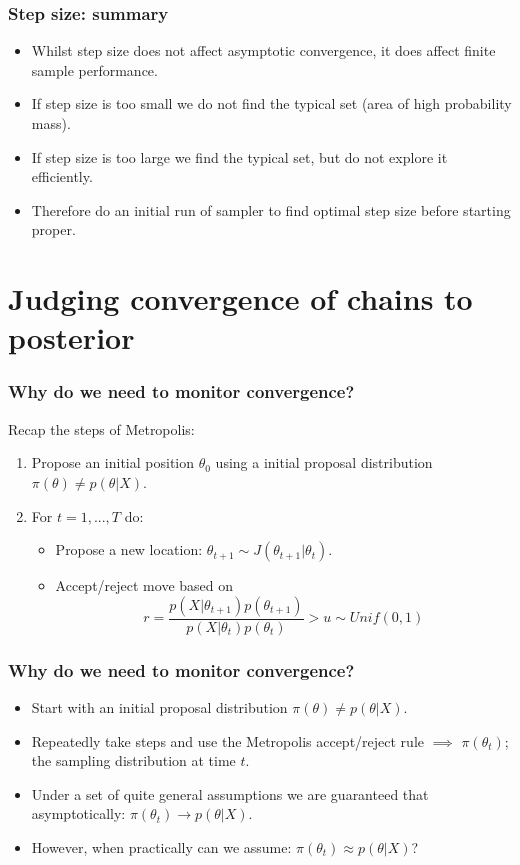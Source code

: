 \documentclass[handout]{beamer}
\begin{document}
\begin{frame}
\frametitle{Step size: summary}
\begin{itemize}
\item<2-> Whilst step size does not affect asymptotic convergence, it does affect finite sample performance.
\item<3-> If step size is too small we do not find the typical set (area of high probability mass). 
\item<4-> If step size is too large we find the typical set, but do not explore it efficiently.
\item<5-> Therefore do an initial run of sampler to find optimal step size before starting proper.
\end{itemize}

\end{frame}

\section{Judging convergence of chains to posterior}
\frame{\tableofcontents[currentsection]}


\begin{frame}
\frametitle{Why do we need to monitor convergence?}
Recap the steps of Metropolis:
\begin{enumerate}
\item<2-> Propose an initial position $\theta_0$ using a initial proposal distribution $\pi(\theta)\neq p(\theta|X)$.
\item<3-> For $t=1,...,T$ do:
\begin{itemize}
\item<4-> Propose a new location:
 $\theta_{t+1}\sim J(\theta_{t+1}|\theta_t)$.
\item<5-> Accept/reject move based on
\begin{equation}
r = \frac{p(X|\theta_{t+1}) p(\theta_{t+1})}{p(X|\theta_{t}) p(\theta_{t})} > u\sim Unif(0,1)
\end{equation}
\end{itemize}
\end{enumerate}

\end{frame}


\begin{frame}
\frametitle{Why do we need to monitor convergence?}
\begin{itemize}
\item<2-> Start with an initial proposal distribution $\pi(\theta)\neq p(\theta|X)$.
\item<3-> Repeatedly take steps and use the Metropolis accept/reject rule $\implies$ $\pi(\theta_t)$; the sampling distribution at time $t$.
\item<4-> Under a set of quite general assumptions we are guaranteed that asymptotically: $\pi(\theta_t)\rightarrow p(\theta|X)$.
\item<5-> However, when practically can we assume: $\pi(\theta_t)\approx p(\theta|X)$?
\end{itemize}
\end{frame}
\end{document}

